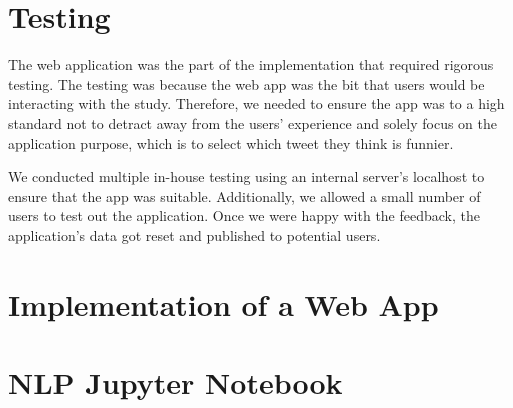 
\chapter{Testing}

The web application was the part of the implementation that required rigorous testing. The testing was because the web app was the bit that users would be interacting with the study. Therefore, we needed to ensure the app was to a high standard not to detract away from the users' experience and solely focus on the application purpose, which is to select which tweet they think is funnier. 

We conducted multiple in-house testing using an internal server's localhost to ensure that the app was suitable. Additionally, we allowed a small number of users to test out the application. Once we were happy with the feedback, the application's data got reset and published to potential users.

\chapter{Implementation of a Web App}
\label{app:implementation_algorithm}





\chapter{NLP Jupyter Notebook}
\label{app:jupyter_nb}
%


